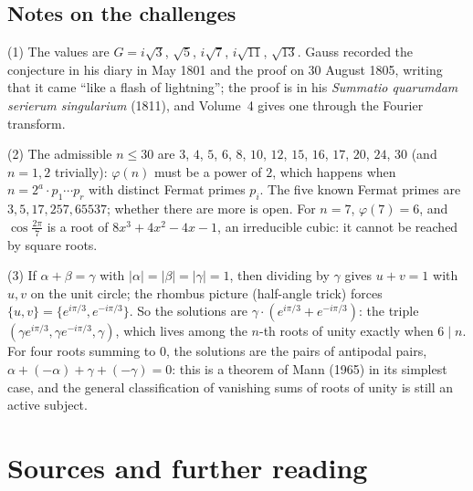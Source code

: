 \subsection*{Notes on the challenges}

(1) The values are $G=i\sqrt3$, $\sqrt5$, $i\sqrt7$, $i\sqrt{11}$, $\sqrt{13}$. Gauss recorded the conjecture in his diary in May 1801 and the proof on 30 August 1805, writing that it came ``like a flash of lightning''; the proof is in his \emph{Summatio quarumdam serierum singularium} (1811), and Volume~4 gives one through the Fourier transform.

(2) The admissible $n\le30$ are $3$, $4$, $5$, $6$, $8$, $10$, $12$, $15$, $16$, $17$, $20$, $24$, $30$ (and $n=1,2$ trivially): $\varphi(n)$ must be a power of $2$, which happens when $n=2^a\cdot p_1\cdots p_r$ with distinct Fermat primes $p_i$. The five known Fermat primes are $3,5,17,257,65537$; whether there are more is open. For $n=7$, $\varphi(7)=6$, and $\cos\frac{2\pi}7$ is a root of $8x^3+4x^2-4x-1$, an irreducible cubic: it cannot be reached by square roots.

(3) If $\alpha+\beta=\gamma$ with $|\alpha|=|\beta|=|\gamma|=1$, then dividing by $\gamma$ gives $u+v=1$ with $u,v$ on the unit circle; the rhombus picture (half-angle trick) forces $\{u,v\}=\{e^{i\pi/3},e^{-i\pi/3}\}$. So the solutions are $\gamma\cdot(e^{i\pi/3}+e^{-i\pi/3})$: the triple $(\gamma e^{i\pi/3},\gamma e^{-i\pi/3},\gamma)$, which lives among the $n$-th roots of unity exactly when $6\mid n$. For four roots summing to $0$, the solutions are the pairs of antipodal pairs, $\alpha+(-\alpha)+\gamma+(-\gamma)=0$: this is a theorem of Mann (1965) in its simplest case, and the general classification of vanishing sums of roots of unity is still an active subject.

\section*{Sources and further reading}

